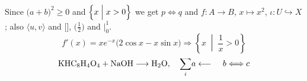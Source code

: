 \documentclass[11pt]{article}
\begin{document}
Since $\bigl(a+b\bigr)^2 \geq 0$ and $\Bigl\{x \Bigm| x>0\Bigr\}$ we get $p\iff q$ and $f: A\longrightarrow B$,
$x\mapsto x^2$, $\iota: U\hookrightarrow X$; also $\biggl\langle u, v\biggr\rangle$ and $\Biggl[\Biggr]$, {\small $\bigl(\frac{1}{2}\bigr)$ and $\Big|_{0}^{1}$}.
\[ f'(x) = x e^{-x}\bigl(2\cos x - x\sin x\bigr) \Longrightarrow \left\{ x \;\middle|\; \frac{1}{x} > 0 \right\} \]
\[ \mathrm{KHC_8H_4O_4} + \mathrm{NaOH} \longrightarrow \mathrm{H_2O}, \quad \smash{\sum_{i}} a \longleftarrow \phantom{xy}\mathstrut b \Longleftrightarrow c \]
\end{document}
